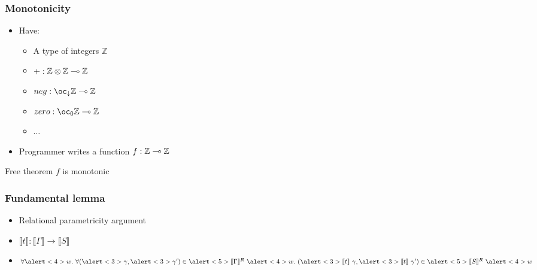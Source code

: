 \documentclass{beamer}
\begin{document}
  \begin{frame}
    \frametitle{Monotonicity}
    \newcommand{\Z}{\mathbb{Z}}
    \begin{itemize}
    \item Have: \pause
      \begin{itemize}
      \item A type of integers $\Z$ \pause
      \item $+ : \fun{\tensor{\Z}{\Z}}{\Z}$ \pause
      \item $\mathop{neg} : \fun{\excl{\downarrow}{\Z}}{\Z}$ \pause
      \item $\mathop{zero} : \fun{\excl{0}{\Z}}{\Z}$ \pause
      \item $\dots$
      \end{itemize}
    \item Programmer writes a function $f : \fun{\Z}{\Z}$ \pause
    \end{itemize}
    \begin{block}{Free theorem}
      $f$ is monotonic
    \end{block}
  \end{frame}
  \begin{frame}
    \frametitle{Fundamental lemma}
    \begin{itemize}
    \item<1-> Relational parametricity argument
    \item<2-> $\llbracket t \rrbracket : \llbracket \Gamma \rrbracket \to
      \llbracket S \rrbracket$
    \item<3-> $\forall \alert<4>{w}.~\forall(\alert<3>{\gamma}, \alert<3>{\gamma'}) \in \alert<5>{\llbracket \Gamma
      \rrbracket^R}~\alert<4>{w}.~(\alert<3>{\llbracket t \rrbracket~\gamma}, \alert<3>{\llbracket t
      \rrbracket~\gamma'}) \in \alert<5>{\llbracket S \rrbracket^R}~\alert<4>{w}$
    \end{itemize}
  \end{frame}
\end{document}

